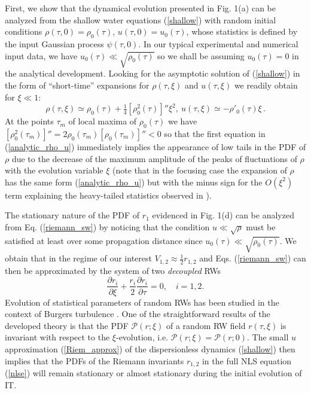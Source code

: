 \documentclass[twocolumn,preprintnumbers,amsmath,amssymb,superscriptaddress]{revtex4}
\begin{document}
First, we show that the dynamical evolution presented in Fig. 1(a) 
can be analyzed from the shallow water equations (\ref{shallow}) with random
initial conditions $\rho(\tau, 0)=\rho_0(\tau)$, $u(\tau, 0)= u_0(\tau)$, 
whose statistics is defined by the input Gaussian process $\psi(\tau, 0)$. 
In our typical experimental and numerical input data, 
we have $u_0(\tau) \ll \sqrt{\rho_0(\tau)}$ so we shall be
assuming $u_0(\tau)=0$ in the analytical development. Looking for the
asymptotic solution of (\ref{shallow}) in the form of ``short-time''
expansions  for  $\rho(\tau, \xi)$ and $u(\tau, \xi)$ we readily
obtain for $\xi \ll 1$:
\begin{equation}\label{analytic_rho_u}
\rho(\tau,\xi) \simeq \rho_0(\tau) + \tfrac14{[\rho_0^2(\tau)]'' \xi^2} ,  \  u(\tau,\xi) \simeq - \rho'_0(\tau) \xi \, .
\end{equation}
 At the points $\tau_m$ of local maxima of $\rho_0(\tau)$
 we have $[\rho_0^2(\tau_m)]'' = 2\rho_0(\tau_m)[\rho_0(\tau_m)]'' <0$ so that the first equation in
 (\ref{analytic_rho_u})  immediately implies the appearance of low tails in 
the PDF of $\rho$ due to the decrease of the maximum amplitude of 
the peaks of fluctuations of $\rho$ with  the evolution
variable $\xi$ (note that in the focusing case  the expansion of $\rho$ has the same form (\ref{analytic_rho_u}) but with the minus sign for the $O(\xi^2)$ term explaining the heavy-tailed statistics observed in \cite{Walczak:15}).

The stationary nature of the PDF of $r_1$ evidenced in Fig. 1(d) 
can be analyzed from Eq. (\ref{riemann_sw})
by noticing that the condition $u \ll \sqrt{\rho}$  must be
satisfied at least over some propagation distance since
$u_0(\tau) \ll \sqrt{\rho_0(\tau)}$. We obtain that in
 the regime of our interest $V_{1,2} \approx \frac12 r_{1,2}$ 
and Eqs. (\ref{riemann_sw}) can then be approximated  by the
system of two {\it decoupled} RWs
\begin{equation}\label{Riem_approx}
\frac{\partial r_i}{\partial \xi} + \frac{r_i}{2}\frac{\partial
  r_i}{\partial \tau}=0, \quad i=1,2.
\end{equation}
Evolution of statistical parameters of random RWs has been studied in
the context of Burgers turbulence  \cite{gurbatov1991nonlinear}. One
of the  straightforward results of the developed
theory is that the PDF $\mathcal{P}(r; \xi)$ of a random RW field
$r(\tau, \xi)$ is invariant with respect to the $\xi$-evolution,
i.e. $\mathcal{P}(r; \xi) = \mathcal{P}(r; 0) $.  The small $u$
approximation (\ref{Riem_approx}) of the  dispersionless dynamics
(\ref{shallow}) then implies that the PDFs of the Riemann invariants
$r_{1,2}$ in the full NLS equation (\ref{nlse}) will remain stationary or almost
stationary during the initial evolution of IT. 
\end{document}
